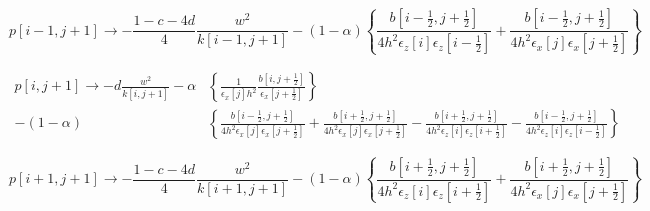 \documentclass[revised,endfloat]{geophysics}
\begin{document}
\begin{equation}
p[i-1,j+1] \rightarrow -\frac{1-c-4d}{4} \frac{w^2}{k[i-1,j+1]} - (1-\alpha)\left\{\frac{b[i-\frac{1}{2}, j+\frac{1}{2}]}{4h^2 \epsilon_z[i] \epsilon_z[i-\frac{1}{2}]} + \frac{b[i-\frac{1}{2}, j+\frac{1}{2}]}{4h^2 \epsilon_x[j] \epsilon_x[j+\frac{1}{2}]}  \right\} 
\label{eq120}
\end{equation}

\begin{equation}
\begin{split}
p[i,j+1] \rightarrow -d\frac{w^2}{k[i,j+1]} - \alpha &\left\{  \frac{1}{\epsilon_x[j] h^2} \frac{b[i,j+\frac{1}{2}]}{\epsilon_x[j+\frac{1}{2}]}\right\} \\
- (1-\alpha) & \left\{  \frac{b[i-\frac{1}{2}, j+\frac{1}{2}]}{4h^2 \epsilon_x[j] \epsilon_x[j+\frac{1}{2}]} + \frac{b[i+\frac{1}{2}, j+\frac{1}{2}]}{4h^2 \epsilon_x[j] \epsilon_x[j+\frac{1}{2}]} - \frac{b[i+\frac{1}{2}, j+\frac{1}{2}]}{4h^2 \epsilon_z[i] \epsilon_z[i+\frac{1}{2}]} - \frac{b[i-\frac{1}{2}, j+\frac{1}{2}]}{4h^2 \epsilon_z[i] \epsilon_z[i-\frac{1}{2}]}  \right\}
\end{split}
\label{eq121}
\end{equation}

\begin{equation}
p[i+1,j+1] \rightarrow -\frac{1-c-4d}{4} \frac{w^2}{k[i+1,j+1]} - (1-\alpha)\left\{\frac{b[i+\frac{1}{2}, j+\frac{1}{2}]}{4h^2 \epsilon_z[i] \epsilon_z[i+\frac{1}{2}]} + \frac{b[i+\frac{1}{2}, j+\frac{1}{2}]}{4h^2 \epsilon_x[j] \epsilon_x[j+\frac{1}{2}]}  \right\}
\label{eq122}
\end{equation}
\end{document}
